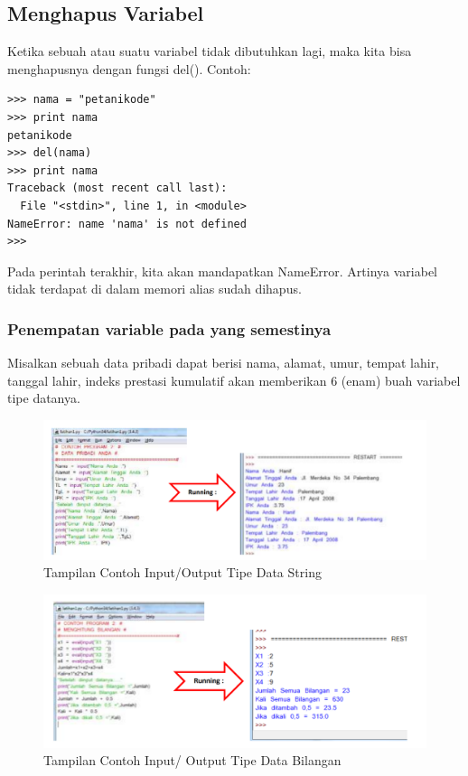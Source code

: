 \subsection{Menghapus Variabel}
Ketika sebuah atau suatu variabel tidak dibutuhkan lagi, maka kita bisa menghapusnya dengan fungsi del().
Contoh:

\begin{verbatim}
>>> nama = "petanikode"
>>> print nama
petanikode
>>> del(nama)
>>> print nama
Traceback (most recent call last):
  File "<stdin>", line 1, in <module>
NameError: name 'nama' is not defined
>>>
\end{verbatim}

Pada perintah terakhir, kita akan mandapatkan NameError. Artinya variabel tidak terdapat di dalam memori alias sudah dihapus.

\subsubsection{Penempatan variable pada yang semestinya}
Misalkan sebuah data pribadi dapat berisi nama, alamat, umur, tempat lahir, tanggal lahir, indeks prestasi kumulatif akan memberikan 6 (enam) buah variabel tipe datanya.
\begin{figure}[ht]
    \centerline{\includegraphics[width=1\textwidth]{figures/tipedatastring.png}}
    \caption{Tampilan Contoh Input/Output Tipe Data String}
    \label{tipedatastring}
    \end{figure}

\begin{figure}[ht]
    \centerline{\includegraphics[width=1\textwidth]{figures/tipedatabilangan.png}}
    \caption{Tampilan Contoh Input/ Output Tipe Data Bilangan}
    \label{tipedatabilangan}
    \end{figure}

